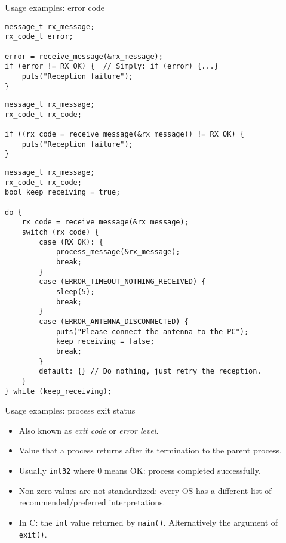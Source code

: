 \documentclass[aspectratio=169,14pt]{beamer}
\begin{document}
\begin{frame}[fragile]{Usage examples: error code}
\begin{lstlisting}[style=cstyle]
message_t rx_message;
rx_code_t error;

error = receive_message(&rx_message);
if (error != RX_OK) {  // Simply: if (error) {...}
    puts("Reception failure");
}
\end{lstlisting}

\begin{lstlisting}[style=cstyle]
message_t rx_message;
rx_code_t rx_code;

if ((rx_code = receive_message(&rx_message)) != RX_OK) {
    puts("Reception failure");
}
\end{lstlisting}
\end{frame}



\begin{frame}[fragile]{}
\begin{lstlisting}[style=cstyle,basicstyle=\scriptsize\ttfamily]
message_t rx_message;
rx_code_t rx_code;
bool keep_receiving = true;

do {
    rx_code = receive_message(&rx_message);
    switch (rx_code) {
        case (RX_OK): {
            process_message(&rx_message);
            break;
        }
        case (ERROR_TIMEOUT_NOTHING_RECEIVED) {
            sleep(5);
            break;
        }
        case (ERROR_ANTENNA_DISCONNECTED) {
            puts("Please connect the antenna to the PC");
            keep_receiving = false;
            break;
        }
        default: {} // Do nothing, just retry the reception.
    }
} while (keep_receiving);
\end{lstlisting}
\end{frame}



\begin{frame}{Usage examples: process exit status}
\begin{itemize}
    \item Also known as \textit{exit code} or \textit{error level}.
    \item Value that a process returns after its termination to the parent process.
    \item Usually \texttt{int32} where 0 means OK: process completed successfully.
    \item Non-zero values are not standardized: every OS has a different list of recommended/preferred interpretations.
    \item In C: the \texttt{int} value returned by \texttt{main()}. Alternatively the argument of \texttt{exit()}.
\end{itemize}
\end{frame}
\end{document}
